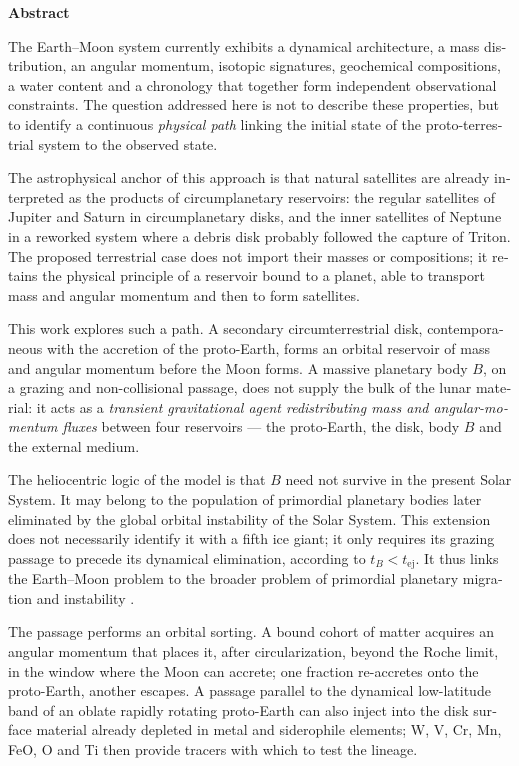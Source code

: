 \documentclass[11pt,a4paper,openany]{report}
\begin{document}
\bigskip
\begin{otherlanguage}{english}
\begin{center}{\Large\bfseries Abstract}\end{center}
\medskip

The Earth--Moon system currently exhibits a dynamical architecture, a mass distribution, an
angular momentum, isotopic signatures, geochemical compositions, a water content and a chronology
that together form independent observational constraints. The question addressed here is not to
describe these properties, but to identify a continuous \emph{physical path} linking the initial
state of the proto-terrestrial system to the observed state.

The astrophysical anchor of this approach is that natural satellites are already interpreted as
the products of circumplanetary reservoirs: the regular satellites of Jupiter and Saturn in
circumplanetary disks, and the inner satellites of Neptune in a reworked system where a debris
disk probably followed the capture of Triton. The proposed terrestrial case does not import their
masses or compositions; it retains the physical principle of a reservoir bound to a planet, able
to transport mass and angular momentum and then to form satellites.

This work explores such a path. A secondary circumterrestrial disk, contemporaneous with the
accretion of the proto-Earth, forms an orbital reservoir of mass and angular momentum before the
Moon forms. A massive planetary body $B$, on a grazing and non-collisional passage, does not
supply the bulk of the lunar material: it acts as a \emph{transient gravitational agent
redistributing mass and angular-momentum fluxes} between four reservoirs --- the proto-Earth, the
disk, body $B$ and the external medium.

The heliocentric logic of the model is that $B$ need not survive in the present Solar System. It
may belong to the population of primordial planetary bodies later eliminated by the global orbital
instability of the Solar System. This extension does not necessarily identify it with a fifth ice
giant; it only requires its grazing passage to precede its dynamical elimination, according to
$t_B<t_{\mathrm{ej}}$. It thus links the Earth--Moon problem to the broader problem of primordial
planetary migration and instability
\cite{Tsiganis2005,Gomes2005,Nesvorny2011,NesvornyMorbidelli2012,Liu2022,Clement2018}.

The passage performs an orbital sorting. A bound cohort of matter acquires an angular momentum
that places it, after circularization, beyond the Roche limit, in the window where the Moon can
accrete; one fraction re-accretes onto the proto-Earth, another escapes. A passage parallel to the
dynamical low-latitude band of an oblate rapidly rotating proto-Earth can also inject into the disk
surface material already depleted in metal and siderophile elements; W, V, Cr, Mn, FeO, O and Ti
then provide tracers with which to test the lineage.


\end{otherlanguage}
\end{document}
